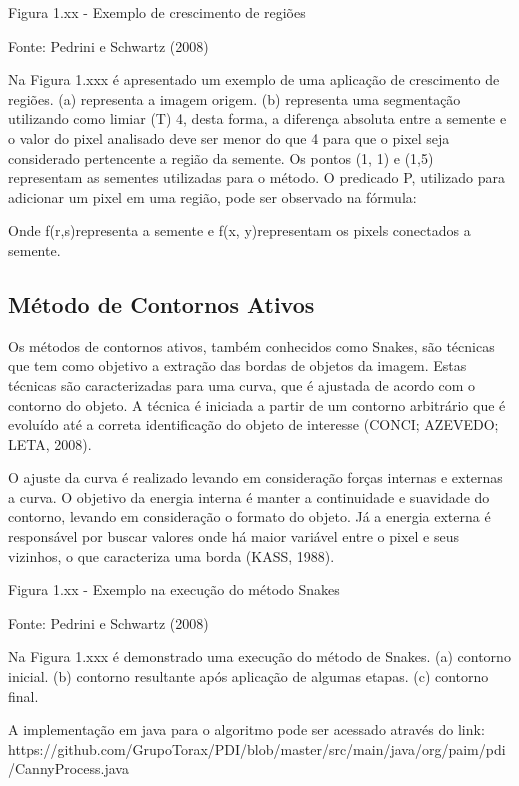 \documentclass[
	12pt,				%
	oneside,			%
	a4paper,			%
	english,			%
	french,				%
	spanish,			%
	brazil,				%
	]{abntex2}
\begin{document}
Figura 1.xx - Exemplo de crescimento de regiões

Fonte: Pedrini e Schwartz (2008)	

Na Figura 1.xxx é apresentado um exemplo de uma aplicação de crescimento de regiões. (a) representa a imagem origem. (b) representa uma segmentação utilizando como limiar (T) 4, desta forma, a diferença absoluta entre a semente e o valor do pixel analisado deve ser menor do que 4 para que o pixel seja considerado pertencente a região da semente. Os pontos (1, 1) e (1,5) representam as sementes utilizadas para o método. O predicado P, utilizado para adicionar um pixel em uma região, pode ser observado na fórmula:


Onde f(r,s)representa a semente e f(x, y)representam os pixels conectados a semente.
    
\subsection{Método de Contornos Ativos}     

Os métodos de contornos ativos, também conhecidos como Snakes, são técnicas que tem como objetivo a extração das bordas de objetos da imagem. Estas técnicas são caracterizadas para uma curva, que é ajustada de acordo com o contorno do objeto. A técnica é iniciada a partir de um contorno arbitrário que é evoluído até a correta identificação do objeto de interesse (CONCI; AZEVEDO; LETA, 2008).

O ajuste da curva é realizado levando em consideração forças internas e externas a curva. O objetivo da energia interna é manter a continuidade e suavidade do contorno, levando em consideração o formato do objeto. Já a energia externa é responsável por buscar valores onde há maior variável entre o pixel e seus vizinhos, o que caracteriza uma borda (KASS, 1988).

Figura 1.xx - Exemplo na execução do método Snakes

Fonte: Pedrini e Schwartz (2008)	

Na Figura 1.xxx é demonstrado uma execução do método de Snakes. (a) contorno inicial. (b) contorno resultante após aplicação de algumas etapas. (c) contorno final.

A implementação em java para o algoritmo pode ser acessado através do link:
https://github.com/GrupoTorax/PDI/blob/master/src/main/java/org/paim/pdi/CannyProcess.java 

\end{document}
